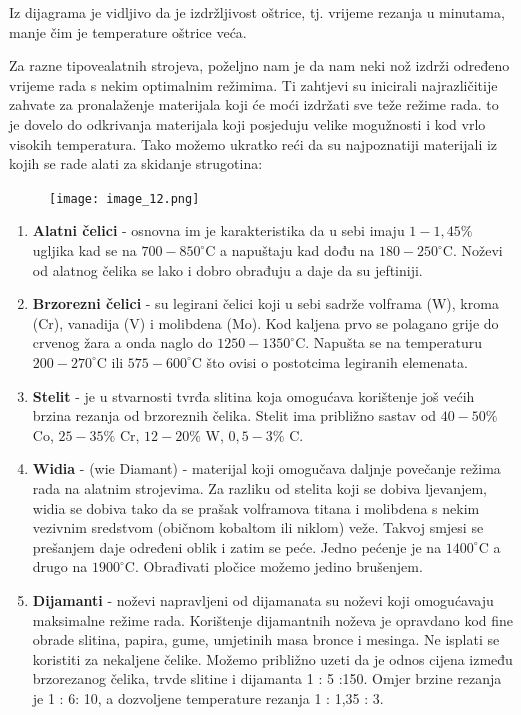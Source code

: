 \documentclass[a4paper,12pt]{article}
\numberwithin{figure}{section}
\begin{document}
Iz dijagrama je vidljivo da je izdržljivost oštrice, tj. vrijeme rezanja u minutama, manje čim je temperature oštrice veća.\par 
Za razne tipovealatnih strojeva, poželjno nam je da nam neki nož izdrži određeno vrijeme rada s nekim optimalnim režimima. Ti zahtjevi su inicirali najrazličitije zahvate za pronalaženje materijala koji će moći izdržati sve teže režime rada. to je dovelo do odkrivanja materijala koji posjeduju velike mogužnosti i kod vrlo visokih temperatura. Tako možemo ukratko reći da su najpoznatiji materijali iz kojih se rade alati za skidanje strugotina:
\begin{figure}[!h]
\centering
\texttt{[image: image\_12.png]}
\end{figure}
\FloatBarrier
\begin{enumerate}
\item \textbf{Alatni čelici} - osnovna im je karakteristika da u sebi imaju $1-1,45\%$ ugljika kad se na $700 - 850^{\circ}$C a napuštaju kad dođu na $180 - 250^{\circ}$C. Noževi od alatnog čelika se lako i dobro obrađuju a daje da su jeftiniji.
\item \textbf{Brzorezni čelici} - su legirani čelici koji u sebi sadrže volframa (W), kroma (Cr), vanadija (V) i molibdena (Mo). Kod kaljena prvo se polagano grije do crvenog žara a onda naglo do $1250 - 1350^{\circ}$C. Napušta se na temperaturu $200 - 270^{\circ}$C ili $575 - 600^{\circ}$C što ovisi o postotcima legiranih elemenata.
\item \textbf{Stelit} - je u stvarnosti tvrđa slitina koja omogućava korištenje još većih brzina rezanja od brzoreznih čelika. Stelit ima približno sastav od $40-50\%$ Co, $25 - 35\%$ Cr, $12 - 20\%$ W, $0,5-3\%$ C.
\item \textbf{Widia} - (wie Diamant) - materijal koji omogučava daljnje povečanje režima rada na alatnim strojevima. Za razliku od stelita koji se dobiva ljevanjem, widia se dobiva tako da se prašak volframova titana i molibdena s nekim vezivnim sredstvom (običnom kobaltom ili niklom) veže. Takvoj smjesi se prešanjem daje određeni oblik i zatim se peće. Jedno pećenje je na $1400^{\circ}$C a drugo na $1900^{\circ}$C. Obrađivati pločice možemo jedino brušenjem.
\item \textbf{Dijamanti} - noževi napravljeni od dijamanata su noževi koji omogućavaju maksimalne režime rada. Korištenje dijamantnih noževa je opravdano kod fine obrade slitina, papira, gume, umjetinih masa bronce i mesinga. Ne isplati se koristiti za nekaljene čelike. Možemo približno uzeti da je odnos cijena između brzorezanog čelika, trvde slitine i dijamanta 1 : 5 :150. Omjer brzine rezanja je 1 : 6: 10, a dozvoljene temperature rezanja 1 : 1,35 : 3.\par

\end{enumerate}
\end{document}

